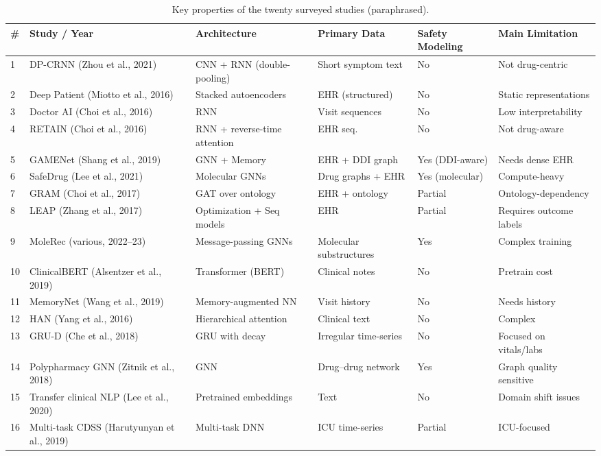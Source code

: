 \documentclass[conference,onecolumn]{IEEEtran}
\begin{document}
\begin{table}[h]
\centering
\caption{Key properties of the twenty surveyed studies (paraphrased).}
\label{tab:comparison}
\begin{tabularx}{\textwidth}{@{}l l X X X X@{}}
\toprule
\textbf{#} & \textbf{Study / Year} & \textbf{Architecture} & \textbf{Primary Data} & \textbf{Safety Modeling} & \textbf{Main Limitation} \\
\midrule
1 & DP-CRNN (Zhou et al., 2021) & CNN + RNN (double-pooling) & Short symptom text & No & Not drug-centric \\
2 & Deep Patient (Miotto et al., 2016) & Stacked autoencoders & EHR (structured) & No & Static representations \\
3 & Doctor AI (Choi et al., 2016) & RNN & Visit sequences & No & Low interpretability \\
4 & RETAIN (Choi et al., 2016) & RNN + reverse-time attention & EHR seq. & No & Not drug-aware \\
5 & GAMENet (Shang et al., 2019) & GNN + Memory & EHR + DDI graph & Yes (DDI-aware) & Needs dense EHR \\
6 & SafeDrug (Lee et al., 2021) & Molecular GNNs & Drug graphs + EHR & Yes (molecular) & Compute-heavy \\
7 & GRAM (Choi et al., 2017) & GAT over ontology & EHR + ontology & Partial & Ontology-dependency \\
8 & LEAP (Zhang et al., 2017) & Optimization + Seq models & EHR & Partial & Requires outcome labels \\
9 & MoleRec (various, 2022–23) & Message-passing GNNs & Molecular substructures & Yes & Complex training \\
10 & ClinicalBERT (Alsentzer et al., 2019) & Transformer (BERT) & Clinical notes & No & Pretrain cost \\
11 & MemoryNet (Wang et al., 2019) & Memory-augmented NN & Visit history & No & Needs history \\
12 & HAN (Yang et al., 2016) & Hierarchical attention & Clinical text & No & Complex \\
13 & GRU-D (Che et al., 2018) & GRU with decay & Irregular time-series & No & Focused on vitals/labs \\
14 & Polypharmacy GNN (Zitnik et al., 2018) & GNN & Drug–drug network & Yes & Graph quality sensitive \\
15 & Transfer clinical NLP (Lee et al., 2020) & Pretrained embeddings & Text & No & Domain shift issues \\
16 & Multi-task CDSS (Harutyunyan et al., 2019) & Multi-task DNN & ICU time-series & Partial & ICU-focused \\

\end{tabularx}
\end{table}
\end{document}
